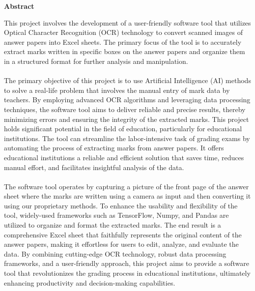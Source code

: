 \newpage
\thispagestyle{empty}
\begin{center}
  \vspace*{1cm}
  \textbf{\large Abstract}
\end{center}
This project involves the development of a user-friendly software tool that utilizes Optical Character Recognition (OCR) technology to convert scanned images of answer papers into Excel sheets. The primary focus of the tool is to accurately extract marks written in specific boxes on the answer papers and organize them in a structured format for further analysis and manipulation.\\
\\
\noindent The primary objective of this project is to use Artificial Intelligence (AI) methods to solve a real-life problem that involves the manual entry of mark data by teachers. By employing advanced OCR algorithms and leveraging data processing techniques, the software tool aims to deliver reliable and precise results, thereby minimizing errors and ensuring the integrity of the extracted marks. This project holds significant potential in the field of education, particularly for educational institutions. The tool can streamline the labor-intensive task of grading exams by automating the process of extracting marks from answer papers. It offers educational institutions a reliable and efficient solution that saves time, reduces manual effort, and facilitates insightful analysis of the data.\\
\\
\noindent The software tool operates by capturing a picture of the front page of the answer sheet where the marks are written using a camera as input and then converting it using our proprietary methods. To enhance the usability and flexibility of the tool, widely-used frameworks such as TensorFlow, Numpy, and Pandas are utilized to organize and format the extracted marks. The end result is a comprehensive Excel sheet that faithfully represents the original content of the
answer papers, making it effortless for users to edit, analyze, and evaluate the data. By combining cutting-edge OCR technology, robust data processing frameworks, and a user-friendly approach, this project aims to provide a software tool that revolutionizes the grading process in educational institutions, ultimately enhancing productivity and decision-making capabilities.

